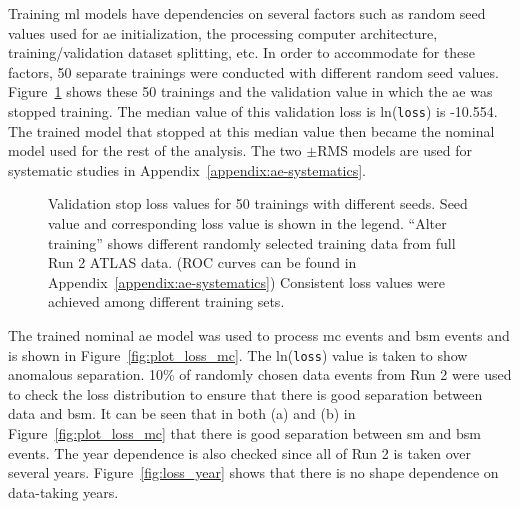 Training \gls{ml} models have dependencies on several factors such as random seed values used for \gls{ae} initialization, the processing computer architecture, training/validation dataset splitting, etc.
In order to accommodate for these factors, 50 separate trainings were conducted with different random seed values. Figure~\ref{fig:loss_seed} shows these 50 trainings and the validation value in which the \gls{ae} was stopped training.
The median value of this validation loss is ln(\texttt{loss}) is -10.554. The trained model that stopped at this median value then became the nominal model used for the rest of the analysis. 
The two $\pm$RMS models are used for systematic studies in Appendix~\ref{appendix:ae-systematics}. 

\begin{figure}
    \begin{center}
    \end{center}
    \caption{Validation stop loss values for 50 trainings with different seeds. Seed value and corresponding loss value is shown in the legend.
    ``Alter training'' shows different randomly selected training data from full Run 2 ATLAS data. (ROC curves can be found in Appendix~\ref{appendix:ae-systematics})
    Consistent loss values were achieved among different training sets.}
\label{fig:loss_seed}
\end{figure}

The trained nominal \gls{ae} model was used to process \gls{mc} events and \gls{bsm} events and is shown in Figure~\ref{fig:plot_loss_mc}. The ln(\texttt{loss}) value is taken to show anomalous separation.
10\% of randomly chosen data events from Run 2 were used to check the loss distribution 
to ensure that there is good separation between data and \gls{bsm}. It can be seen that in both (a) and (b) in Figure~\ref{fig:plot_loss_mc} that there is good separation between \gls{sm} and \gls{bsm} events. The year 
dependence is also checked since all of Run 2 is taken over several years. Figure~\ref{fig:loss_year} shows that there is no shape dependence on data-taking years.

